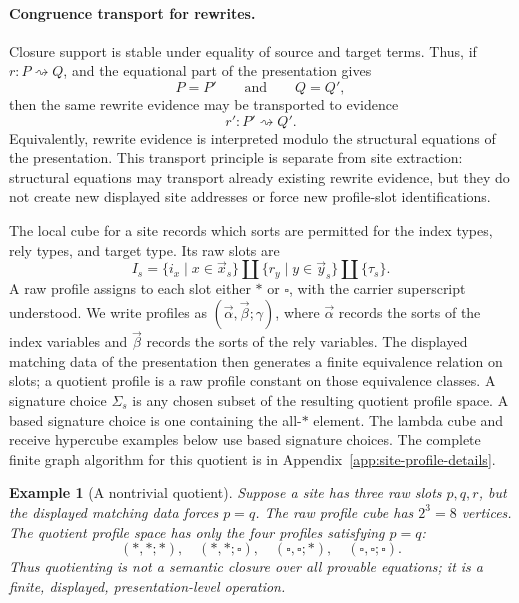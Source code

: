 \documentclass[11pt]{article}
\newcommand{\rw}{\rightsquigarrow}
\newcommand{\Sig}{\Sigma}
\newtheorem{example}[definition]{Example}
\begin{document}
\paragraph{Congruence transport for rewrites.}
Closure support is stable under equality of source and target terms.  Thus,
if \(r:P\rw Q\), and the equational part of the presentation gives
\[
  P=P'
  \qquad\text{and}\qquad
  Q=Q',
\]
then the same rewrite evidence may be transported to evidence
\[
  r':P'\rw Q'.
\]
Equivalently, rewrite evidence is interpreted modulo the structural
equations of the presentation.  This transport principle is separate from
site extraction: structural equations may transport already existing rewrite
evidence, but they do not create new displayed site addresses or force new
profile-slot identifications.

The local cube for a site records which sorts are permitted for the index types,
rely types, and target type.  Its raw slots are
\[
  I_s=
  \{i_x\mid x\in\vec x_s\}\amalg
  \{r_y\mid y\in\vec y_s\}\amalg
  \{\tau_s\}.
\]
A raw profile assigns to each slot either \(\ast\) or \(\square\), with the carrier superscript understood.  We write profiles as \((\vec\alpha,\vec\beta;\gamma)\), where \(\vec\alpha\) records the sorts of the index variables and \(\vec\beta\) records the sorts of the rely variables.  The displayed matching data of the presentation then generates a finite equivalence relation on slots; a quotient profile is a raw profile constant on those equivalence classes.  A signature choice \(\Sig_s\) is any chosen subset of the resulting quotient profile space.  A based signature choice is one containing the all-\(\ast\) element.  The lambda cube and receive hypercube examples below use based signature choices.  The complete finite graph algorithm for this quotient is in Appendix~\ref{app:site-profile-details}.

\begin{example}[A nontrivial quotient]
Suppose a site has three raw slots \(p,q,r\), but the displayed matching data
forces \(p=q\).  The raw profile cube has \(2^3=8\) vertices.  The quotient
profile space has only the four profiles satisfying \(p=q\):
\[
  (\ast,\ast;\ast),\quad
  (\ast,\ast;\square),\quad
  (\square,\square;\ast),\quad
  (\square,\square;\square).
\]
Thus quotienting is not a semantic closure over all provable equations; it is a
finite, displayed, presentation-level operation.
\end{example}
\end{document}
